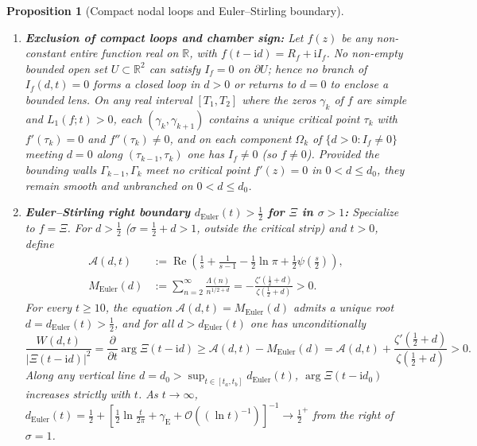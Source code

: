 \documentclass[11pt,a4paper,reqno]{amsart}
\newtheorem{proposition}[theorem]{Proposition}
\theoremstyle{definition}
\theoremstyle{remark}
\numberwithin{equation}{section}
\newcommand{\ii}{\mathrm{i}}
\newcommand{\Rea}{\operatorname{Re}}
\begin{document}
\begin{proposition}[Compact nodal loops and Euler--Stirling boundary]\label{prop:maximum_and_euler}
\begin{enumerate}
\item[\textup{(a)}] \textbf{Exclusion of compact loops and chamber sign:} Let $f(z)$ be any non-constant entire function real on $\mathbb{R}$, with $f(t-\ii d) = R_f + \ii I_f$. No non-empty bounded open set $U \subset \mathbb{R}^2$ can satisfy $I_f = 0$ on $\partial U$; hence no branch of $I_f(d,t) = 0$ forms a closed loop in $d > 0$ or returns to $d = 0$ to enclose a bounded lens. On any real interval $[T_1, T_2]$ where the zeros $\gamma_k$ of $f$ are simple and $L_1(f;t) > 0$, each $(\gamma_k, \gamma_{k+1})$ contains a unique critical point $\tau_k$ with $f'(\tau_k) = 0$ and $f''(\tau_k) \neq 0$, and on each component $\Omega_k$ of $\{d > 0 : I_f \neq 0\}$ meeting $d = 0$ along $(\tau_{k-1}, \tau_k)$ one has $I_f \neq 0$ (so $f \neq 0$). Provided the bounding walls $\Gamma_{k-1}, \Gamma_k$ meet no critical point $f'(z) = 0$ in $0 < d \le d_0$, they remain smooth and unbranched on $0 < d \le d_0$.
\item[\textup{(b)}] \textbf{Euler--Stirling right boundary $d_{\mathrm{Euler}}(t) > \frac{1}{2}$ for $\Xi$ in $\sigma > 1$:} Specialize to $f = \Xi$. For $d > \frac{1}{2}$ ($\sigma = \frac{1}{2}+d > 1$, outside the critical strip) and $t > 0$, define
\begin{equation}\label{eq:A_and_M_def}
\begin{aligned}
\mathcal{A}(d,t) &:= \Rea\left(\frac{1}{s} + \frac{1}{s-1} - \frac{1}{2}\ln\pi + \frac{1}{2}\psi\left(\frac{s}{2}\right)\right), \\
M_{\mathrm{Euler}}(d) &:= \sum_{n=2}^\infty \frac{\Lambda(n)}{n^{1/2+d}} = -\frac{\zeta'\left(\frac{1}{2}+d\right)}{\zeta\left(\frac{1}{2}+d\right)} > 0.
\end{aligned}
\end{equation}
For every $t \ge 10$, the equation $\mathcal{A}(d,t) = M_{\mathrm{Euler}}(d)$ admits a unique root $d = d_{\mathrm{Euler}}(t) > \frac{1}{2}$, and for all $d > d_{\mathrm{Euler}}(t)$ one has unconditionally
\begin{equation}\label{eq:euler_positivity}
\frac{W(d,t)}{\big|\Xi(t-\ii d)\big|^2} = \frac{\partial}{\partial t}\arg\Xi(t-\ii d) \ge \mathcal{A}(d,t) - M_{\mathrm{Euler}}(d) = \mathcal{A}(d,t) + \frac{\zeta'\left(\frac{1}{2}+d\right)}{\zeta\left(\frac{1}{2}+d\right)} > 0.
\end{equation}
Along any vertical line $d = d_0 > \sup_{t \in [t_a,t_b]} d_{\mathrm{Euler}}(t)$, $\arg\Xi(t-\ii d_0)$ increases strictly with $t$. As $t \to \infty$, $d_{\mathrm{Euler}}(t) = \frac{1}{2} + [\frac{1}{2}\ln\frac{t}{2\pi} + \gamma_{\mathrm{E}} + \mathcal{O}((\ln t)^{-1})]^{-1} \to \frac{1}{2}^+$ from the right of $\sigma = 1$.
\end{enumerate}
\end{proposition}
\end{document}
